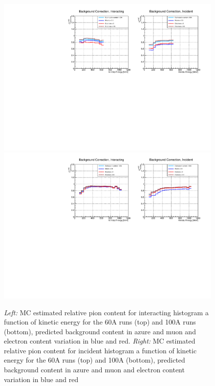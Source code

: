 \begin{figure}[p]
\centering
\includegraphics[width=\textwidth]{Chapter-6/Images/Bkg60A_inc_int.pdf}
\includegraphics[width=\textwidth]{Chapter-6/Images/Bkg100A_inc_int.pdf}
\caption{\emph{Left:} MC estimated relative pion content for interacting histogram a function of kinetic energy for the 60A runs (top) and 100A runs (bottom), predicted background content in azure and muon and electron content variation in blue and red. \emph{Right:}  MC estimated relative pion content  for incident histogram a function of kinetic energy for the 60A runs (top)  and 100A (bottom), predicted background content in azure and muon and electron content variation in blue and red}
\label{fig:CorrectionsBeam}
\end{figure}



